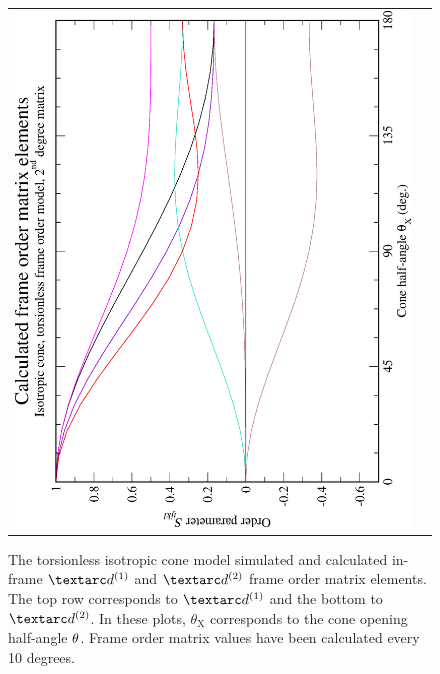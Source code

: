 \begin{figure}
\begin{tabular}{@{}cc@{}}
    \includegraphics[width=.35\textwidth,angle=270]{images/frame_order_matrix/Sijkl_iso_cone_torsionless_in_frame_theta_x_calc.eps} \\
  \end{tabular}
  \caption[Torsionless isotropic cone simulated and calculated in-frame $\FOone$ and $\FOtwo$ elements.]{
    The torsionless isotropic cone model simulated and calculated in-frame $\FOone$ and $\FOtwo$ frame order matrix elements.
    The top row corresponds to $\FOone$ and the bottom to $\FOtwo$.
    In these plots, $\theta_\textrm{X}$ corresponds to the cone opening half-angle $\theta$.
    Frame order matrix values have been calculated every 10 degrees.
  }
  \label{fig: simulated and calculated in-frame 1st and 2nd degree iso cone, torsionless frame order}
\end{figure}

